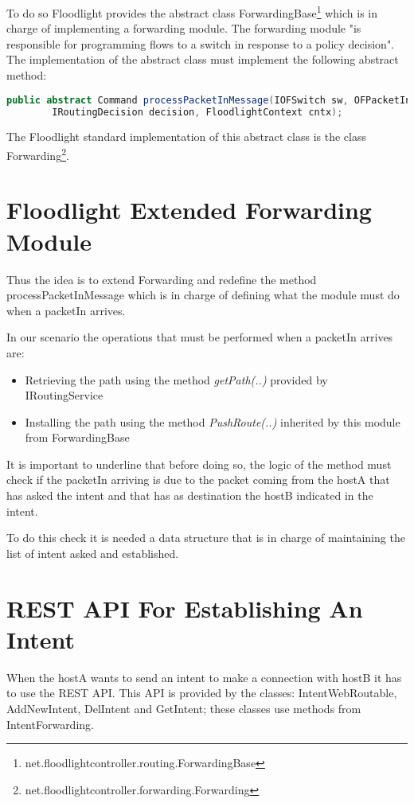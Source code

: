 \documentclass[a4paper]{report}
\begin{document}
	\noindent To do so Floodlight provides the abstract class ForwardingBase\footnote{net.floodlightcontroller.routing.ForwardingBase} which is in charge of implementing a forwarding module. The forwarding module "is responsible for programming flows to a switch in response to a policy decision". The implementation of the abstract class must implement the following abstract method:
	
	\begin{lstlisting}[language=Java]
		public abstract Command processPacketInMessage(IOFSwitch sw, OFPacketIn pi, 
		IRoutingDecision decision, FloodlightContext cntx);
	\end{lstlisting}
	
	
	\noindent The Floodlight standard implementation of this abstract class is the class Forwarding\footnote{net.floodlightcontroller.forwarding.Forwarding}.
	
	\section{Floodlight Extended Forwarding Module}\label{forwarding}
	\noindent Thus the idea is to extend Forwarding and redefine the method processPacketInMessage which is in charge of defining what the module must do when a packetIn arrives.
	
	\noindent In our scenario the operations that must be performed when a packetIn arrives are:
	\begin{itemize}
		\item Retrieving the path using the method \textit{getPath(..)} provided by IRoutingService
		\item Installing the path using the method \textit{PushRoute(..)} inherited by this module from ForwardingBase
	\end{itemize}
	\noindent It is important to underline that before doing so, the logic of the method must check if the packetIn arriving is due to the packet coming from the hostA that has asked the intent and that has as destination the hostB indicated in the intent.
	
	\noindent To do this check it is needed a data structure that is in charge of maintaining the list of intent asked and established.
	
	\section{REST API For Establishing An Intent}
	\noindent When the hostA wants to send an intent to make a connection with hostB it has to use the REST API. This API is provided by the classes: IntentWebRoutable, AddNewIntent, DelIntent and GetIntent; these classes use methods from IntentForwarding.
	
\end{document}
